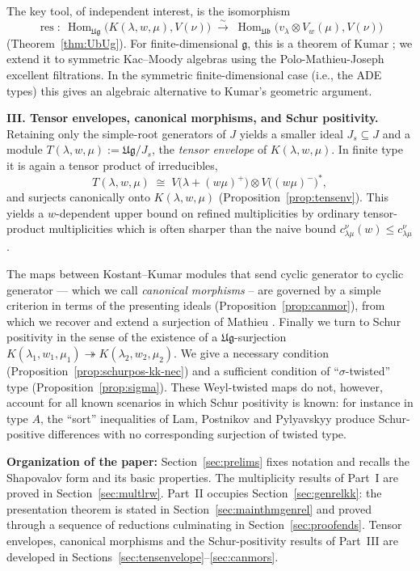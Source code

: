\documentclass[12pt,reqno]{amsart}
\theoremstyle{plain}
\theoremstyle{definition}
\theoremstyle{remark}
\theoremstyle{plain}
\newcommand{\lie}{\mathfrak}
\newcommand{\lrw}{c_{\lambda\mu}^\nu(w)}
\newcommand{\lr}{c_{\lambda\mu}^\nu}
\DeclareMathOperator{\res}{res}
\DeclareMathOperator{\Hom}{Hom}
\begin{document}
The key tool, of independent interest, is the isomorphism
\[
    \res\colon\ \Hom_{\lie{Ug}}\bigl(K(\lambda,w,\mu),V(\nu)\bigr)
    \;\xrightarrow{\ \sim\ }\;
    \Hom_{\lie{Ub}}\bigl(v_\lambda\otimes V_w(\mu),V(\nu)\bigr)
\]
(Theorem~\ref{thm:UbUg}). For
finite-dimensional $\lie g$, this is a theorem of Kumar \cite{Kum1}; we extend it to
symmetric Kac--Moody algebras using the Polo-Mathieu-Joseph excellent filtrations. In the 
symmetric finite-dimensional case (i.e., the ADE types) this gives an
algebraic alternative to Kumar's geometric argument.

\medskip
\noindent\textbf{III. Tensor envelopes, canonical morphisms, and Schur
positivity.}
Retaining only the simple-root generators of $J$ yields a smaller ideal
$J_s\subseteq J$ and a module $T(\lambda,w,\mu):=\lie{Ug}/J_s$, the
\emph{tensor envelope} of $K(\lambda,w,\mu)$. In finite type it is again a
tensor product of irreducibles,
\[
    T(\lambda,w,\mu)\;\cong\;V\!\bigl(\lambda+(w\mu)^+\bigr)\otimes V\!\bigl((w\mu)^-\bigr)^{*},
\]
and surjects canonically onto $K(\lambda,w,\mu)$
(Proposition~\ref{prop:tensenv}). This yields a $w$-dependent upper bound
on refined multiplicities by ordinary tensor-product multiplicities which is often
sharper than the naive bound $\lrw\le\lr$.

The maps between Kostant--Kumar modules that send cyclic generator to
cyclic generator --- which we call \emph{canonical morphisms} -- are governed by a
simple criterion in terms of the presenting ideals
(Proposition~\ref{prop:canmor}), from which we recover and extend a
surjection of Mathieu \cite{M2}. Finally we turn to Schur positivity in the
sense of the existence of a $\lie{Ug}$-surjection
$K(\lambda_1,w_1,\mu_1)\twoheadrightarrow K(\lambda_2,w_2,\mu_2)$. We give a
necessary condition (Proposition~\ref{prop:schurpos-kk-nec}) and a
sufficient condition of ``$\sigma$-twisted'' type (Proposition~\ref{prop:sigma}). These
Weyl-twisted maps do not, however, account for all known scenarios in which Schur positivity is known: for
instance in type $A$, the ``sort'' inequalities of Lam, Postnikov and
Pylyavskyy \cite{LPP} produce Schur-positive differences with no
corresponding surjection of twisted type.

\medskip
\noindent\textbf{Organization of the paper:}
Section~\ref{sec:prelims} fixes notation and recalls the Shapovalov form and its
basic properties.
The multiplicity results of Part~I are proved in
Section~\ref{sec:multlrw}. Part~II occupies Section~\ref{sec:genrelkk}: the
presentation theorem is stated in Section~\ref{sec:mainthmgenrel} and proved through a
sequence of reductions culminating in Section~\ref{sec:proofends}. Tensor envelopes,
canonical morphisms and the Schur-positivity results of Part~III are
developed in Sections~\ref{sec:tensenvelope}--\ref{sec:canmors}. 
\end{document}
